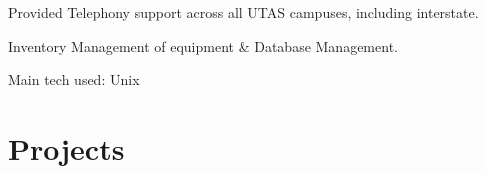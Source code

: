 \documentclass[a4paper]{deedy-resume} %
\begin{document}
\begin{minipage}[t]{0.66\textwidth}

\begin{tightitemize}
\item Provided Telephony support across all UTAS campuses, including interstate.
\item Inventory Management of equipment \& Database Management.
\end{tightitemize}
Main tech used: \textbullet{} Unix

\sectionspace %






\section{Projects}


\end{minipage}
\end{document}
